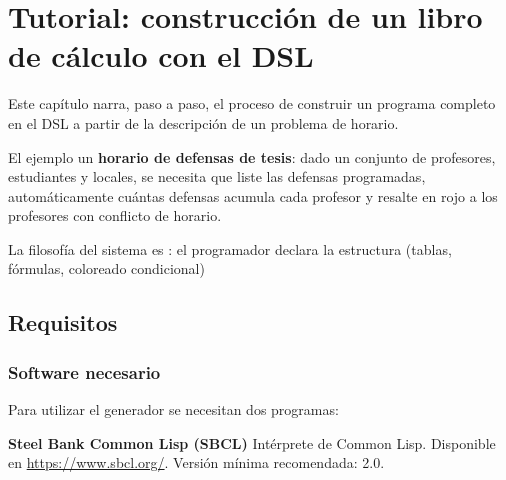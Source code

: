 \documentclass[12pt,a4paper]{report}
\begin{document}
\chapter{Tutorial: construcción de un libro de cálculo con el DSL}
\label{cap:tutorial}


Este capítulo narra, paso a paso, el proceso de construir un programa completo
en el DSL a partir de la descripción de un problema de horario.


El ejemplo  un \textbf{horario de defensas de tesis}:
dado un conjunto de profesores, estudiantes y locales, se necesita
 que liste las defensas
programadas,  automáticamente cuántas defensas acumula cada
profesor y resalte en rojo a los profesores con conflicto de horario.

La filosofía del sistema es : el programador declara la
estructura  (tablas, fórmulas, coloreado condicional) 


\section{Requisitos}
\label{sec:requisitos}


\subsection{Software necesario}

Para utilizar el generador se necesitan dos programas:

\textbf{Steel Bank Common Lisp (SBCL)} \quad Intérprete de Common Lisp.
Disponible en \url{https://www.sbcl.org/}.
Versión mínima recomendada: 2.0.
\end{document}
